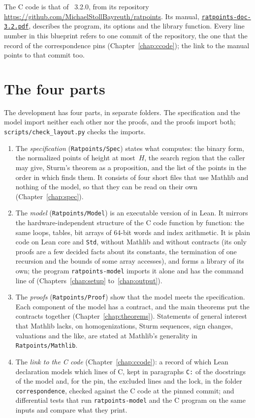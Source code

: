 The C code is that of \ratpoints{}~3.2.0, from its repository
\url{https://github.com/MichaelStollBayreuth/ratpoints}. Its manual,
\href{https://github.com/MichaelStollBayreuth/ratpoints/blob/\ratpointscommit/ratpoints-doc-3.2.pdf}{\texttt{ratpoints-doc-3.2.pdf}},
describes the program, its options and the library function. Every line number in this blueprint
refers to one commit of the repository, the one that the record of the correspondence pins
(Chapter~\ref{chap:ccode}); the link to the manual points to that commit too.

\section{The four parts}\label{sec:overviewParts}

The development has four parts, in separate folders. The specification and the model import
neither each other nor the proofs, and the proofs import both; \verb|scripts/check_layout.py|
checks the imports.
\begin{enumerate}
  \item The \emph{specification} (\verb|Ratpoints/Spec|) states what \ratpoints{} computes: the
    binary form, the normalized points of height at most~$H$, the search region that the caller
    may give, Sturm's theorem as a proposition, and the list of the points in the order in which
    \ratpoints{} finds them. It consists of four short files that use Mathlib and nothing of the
    model, so that they can be read on their own (Chapter~\ref{chap:spec}).
  \item The \emph{model} (\verb|Ratpoints/Model|) is an executable version of \ratpoints{} in Lean.
    It mirrors the hardware-independent structure of the C code function by function: the same
    loops, tables, bit arrays of 64-bit words and index arithmetic. It is plain code on Lean core
    and \verb|Std|, without Mathlib and without contracts (its only proofs are a few decided facts
    about its constants, the termination of one recursion and the bounds of some array accesses),
    and forms a library of its own; the program \verb|ratpoints-model| imports it alone and has the
    command line of \ratpoints{} (Chapters~\ref{chap:setup} to~\ref{chap:output}).
  \item The \emph{proofs} (\verb|Ratpoints/Proof|) show that the model meets the specification.
    Each component of the model has a contract, and the main theorems put the contracts together
    (Chapter~\ref{chap:theorems}). Statements of general interest that Mathlib lacks, on
    homogenizations, Sturm sequences, sign changes, valuations and the like, are stated at
    Mathlib's generality in \verb|Ratpoints/Mathlib|.
  \item The \emph{link to the C code} (Chapter~\ref{chap:ccode}): a record of which Lean
    declaration models which lines of C, kept in paragraphs \verb|C:| of the docstrings of the
    model and, for the pin, the excluded lines and the lock, in the folder \verb|correspondence|,
    checked against the C code at the pinned commit; and differential tests that run
    \verb|ratpoints-model| and the C program on the same inputs and compare what they print.
\end{enumerate}
